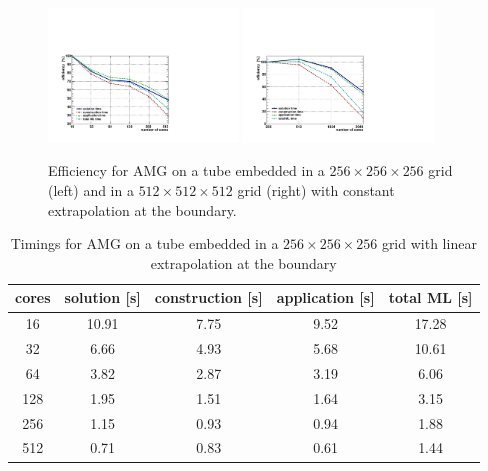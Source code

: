 \begin{figure}[htb] 
  \begin{center}
    \includegraphics[width=0.45\textwidth]{figures/eff_256.pdf}
    \includegraphics[width=0.45\textwidth]{figures/eff_512.pdf}
    \caption{Efficiency for AMG on a tube embedded in a
      $256\times256\times256$ grid (left) and in a
      $512\times512\times512$ grid (right) with constant extrapolation
      at the boundary.}
    \label{fig:speedup}
  \end{center} 
\end{figure}

\begin{table}[htb]
  \begin{center}
    \begin{tabular}{ccccc}
      \hline
      cores & solution [s] & construction [s] & application [s] & total ML [s] \\
      \hline
      16  & 10.91 &  7.75 &  9.52 & 17.28 \\
      32  &  6.66 &  4.93 &  5.68 & 10.61 \\
      64  &  3.82 &  2.87 &  3.19 &  6.06 \\
      128 &  1.95 &  1.51 &  1.64 &  3.15 \\
      256 &  1.15 &  0.93 &  0.94 &  1.88 \\
      512 &  0.71 &  0.83 &  0.61 &  1.44 \\
      \hline
    \end{tabular}
    \caption{Timings for AMG on a tube embedded in a $256\times256\times256$
      grid with linear extrapolation at the boundary}
    \label{tbl:timings_solver_256}
    \end{center}
\end{table}


